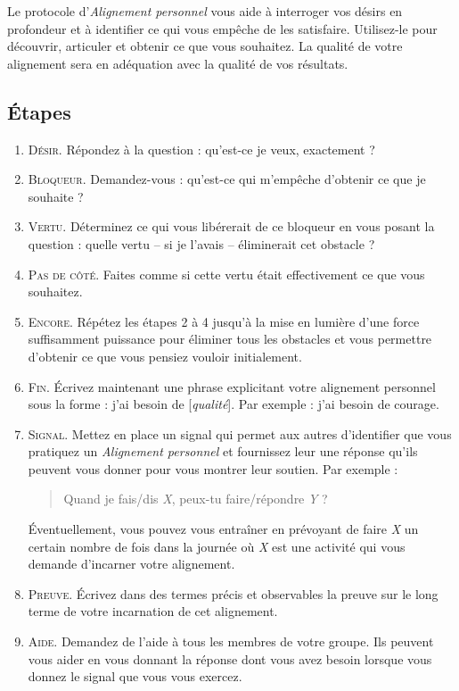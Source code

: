 \documentclass[11pt]{book}
\begin{document}
Le protocole d'\emph{Alignement personnel} vous aide à interroger vos désirs en profondeur et à identifier ce qui vous empêche de les satisfaire. Utilisez-le
pour découvrir, articuler et obtenir ce que vous souhaitez. La qualité de votre alignement sera en adéquation avec la qualité de vos résultats.

\subsection{Étapes}
\begin{enumerate}
	\item \textsc{Désir.} Répondez à la question : \og{}qu'est-ce je veux, exactement ?\fg{}
	\item \textsc{Bloqueur.} Demandez-vous : \og{}qu'est-ce qui m'empêche d'obtenir ce que je souhaite ?\fg{}
	\item \textsc{Vertu.} Déterminez ce qui vous libérerait de ce bloqueur en vous posant la question : \og{}quelle vertu -- si je l'avais -- éliminerait
	      cet obstacle ?\fg{}
	\item \textsc{Pas de côté.} Faites comme si cette vertu était effectivement ce que vous souhaitez.
	\item \textsc{Encore.} Répétez les étapes 2 à 4 jusqu'à la mise en lumière d'une force suffisamment puissance pour éliminer tous les obstacles et vous permettre
	      d'obtenir ce que vous pensiez vouloir initialement.
	\item \textsc{Fin.} Écrivez maintenant une phrase explicitant votre alignement personnel sous la forme : \og{}j'ai besoin de [\emph{qualité}]\fg{}.
	      Par exemple : \og{}j'ai besoin de courage\fg{}.
	\item \textsc{Signal.} Mettez en place un signal qui permet aux autres d'identifier que vous pratiquez un \emph{Alignement personnel}
	      et fournissez leur une réponse qu'ils peuvent vous donner pour vous montrer leur soutien. Par exemple :
	      \begin{quote}
	      	\og{}Quand je fais/dis \emph{X}, peux-tu faire/répondre \emph{Y} ?\fg{}
	      \end{quote}
	      Éventuellement, vous pouvez vous entraîner en prévoyant de faire \emph{X} un certain nombre de fois dans la journée où \emph{X} est une activité
	      qui vous demande d'incarner votre alignement.
	\item \textsc{Preuve.} Écrivez dans des termes précis et observables la preuve sur le long terme de votre incarnation de cet alignement.
	\item \textsc{Aide.} Demandez de l'aide à tous les membres de votre groupe. Ils peuvent vous aider en vous donnant la réponse dont vous avez besoin lorsque
	      vous donnez le signal que vous vous exercez.
\end{enumerate}
\end{document}
